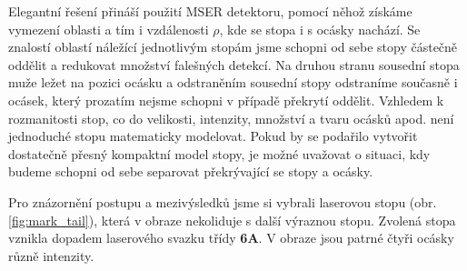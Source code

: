 	Elegantní řešení přináší použití MSER detektoru, pomocí něhož získáme vymezení oblasti a tím i vzdálenosti $\rho$, kde se stopa i s ocásky nachází. Se znalostí oblastí náležící jednotlivým stopám jsme schopni od sebe stopy částečně oddělit a redukovat množství falešných detekcí. Na druhou stranu sousední stopa muže ležet na pozici ocásku a odstraněním sousední stopy odstraníme současně i ocásek, který prozatím nejsme schopni v případě překrytí oddělit. Vzhledem k rozmanitosti stop, co do velikosti, intenzity, množství a tvaru ocásků apod. není jednoduché stopu matematicky modelovat. Pokud by se podařilo vytvořit dostatečně přesný kompaktní model stopy, je možné uvažovat o situaci, kdy budeme schopni od sebe separovat překrývající se stopy a ocásky. 
	
 Pro znázornění postupu a mezivýsledků jsme si vybrali laserovou stopu (obr.\ref{fig:mark_tail}), která v obraze nekoliduje s další výraznou stopu. Zvolená stopa vznikla dopadem laserového svazku třídy \textbf{6A}. V obraze jsou patrné čtyři ocásky různě intenzity. 
	

